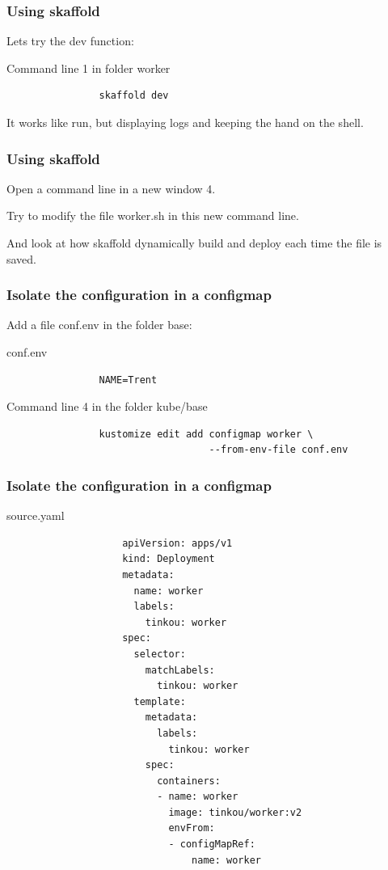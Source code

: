 	\begin{frame}[fragile]
		\frametitle{Using skaffold}
		
		Lets try the dev function:
		\begin{block}{Command line 1 in folder worker}
			\begin{verbatim}
				skaffold dev
			\end{verbatim}					
		\end{block}

		It works like run, but displaying logs and keeping the hand on the shell.
	\end{frame}
	
	\begin{frame}
		\frametitle{Using skaffold}

		Open a command line in a new window 4.		
		
		Try to modify the file worker.sh in this new command line.
		
		\bigskip
		
		And look at how skaffold dynamically build and deploy each time the file is saved.
	\end{frame}
	
	\begin{frame}[fragile]
		\frametitle{Isolate the configuration in a configmap}

		Add a file conf.env in the folder base:
		\begin{block}{conf.env}
			\begin{verbatim}
				NAME=Trent
			\end{verbatim}
		\end{block}				
		
		\begin{block}{Command line 4 in the folder kube/base}
			\begin{verbatim}
				kustomize edit add configmap worker \
				                   --from-env-file conf.env
			\end{verbatim}
		\end{block}
	\end{frame}

	\begin{frame}[fragile]
		\frametitle{Isolate the configuration in a configmap}

		\begin{block}{source.yaml}
			\begin{tiny}
				\begin{verbatim}
					apiVersion: apps/v1
					kind: Deployment
					metadata:
					  name: worker
					  labels:
					    tinkou: worker
					spec:
					  selector:
					    matchLabels:
					      tinkou: worker
					  template:
					    metadata:
					      labels:
					        tinkou: worker
					    spec:
					      containers:
					      - name: worker
					        image: tinkou/worker:v2
					        envFrom:
					        - configMapRef:
					            name: worker
				\end{verbatim}
			\end{tiny}			
		\end{block}
	\end{frame}
	
